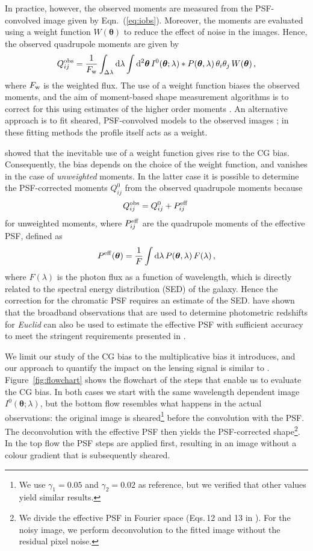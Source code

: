 \documentclass[useAMS,usenatbib]{mnras}
\renewcommand{\d}{\mathrm{d}}
\newcommand{\be}{\begin{equation}}
\newcommand{\ee}{\end{equation}}
\begin{document}
In practice, however, the observed moments are measured from the PSF-convolved image given by
Eqn.~(\ref{eq:iobs}). Moreover, the moments are evaluated using a weight function $W({\bm\theta})$  to reduce the effect of noise in the images. Hence, the observed quadrupole moments are given by
\be
Q^{\rm obs}_{ij} = {1 \over F_{\rm w}} \int_{\Delta\lambda} \d\lambda \int \d^2 {\bm\theta} \,
I^0({\bm\theta}; \lambda) *  P({\bm\theta},\lambda)\, \theta_i \theta_j \, W({\bm \theta})\,,
\ee
%
where $F_{\rm w}$ is the weighted flux. The use of a weight function biases the observed moments,
and the aim of moment-based shape measurement algorithms is to correct for this using estimates of the higher order moments \citep[e.g.][]{Kaiser1995,Melchior11}. An alternative approach is to fit sheared, PSF-convolved models to the observed images
\citep[e.g.][]{Bridle02,Miller13}; in these fitting methods the profile itself acts as a weight.

 showed that the inevitable use of a weight function gives rise to the CG bias.
Consequently, the bias depends on the choice of the weight function, and vanishes in the case of {\it unweighted} moments. In the latter case it is possible to determine the PSF-corrected moments $Q^0_{ij}$ from the observed quadrupole moments because
%
\be
Q^{\rm obs}_{ij}=Q^0_{ij}+P^{\rm eff}_{ij} \,\label{eq:unweighted}
\ee
%
for unweighted moments, where $P^{\rm eff}_{ij}$ are the quadrupole moments of the effective PSF,  defined as
\be
P^{\rm eff}({\bm \theta}) = \frac{1}{F} \int \d \lambda\, P({\bm \theta},\lambda)\, F(\lambda) \,,
\ee
%
where $F(\lambda)$ is the photon flux as a function of wavelength, which is directly related to the spectral energy distribution (SED) of the galaxy. Hence the correction for the chromatic PSF requires an estimate of the SED.  \cite{Eriksen17} have shown that the broadband observations that are used to determine photometric redshifts for {\it Euclid} can also be used to estimate the effective PSF with sufficient accuracy to meet the stringent requirements presented in \cite{Cropper13}.


We limit our study of the CG bias to the multiplicative bias it introduces, and our approach to quantify
the impact on the lensing signal is similar to . Figure~\ref{fig:flowchart} shows the flowchart of the steps that enable us to evaluate the CG bias.  In both cases we start with the same wavelength dependent image $I^0({\bm \theta};\lambda)$, but the bottom flow resembles what happens in the actual observations: the original image is sheared\footnote{We use
$\gamma_1=0.05$  and $\gamma_2=0.02$ as reference, but we verified that other values yield similar results.} before the convolution with the PSF. The deconvolution with the effective PSF then yields the PSF-corrected shape\footnote{We divide the effective PSF in Fourier space (Eqs.\,12 and 13 in ). For the noisy image, we perform deconvolution to the fitted image without the residual pixel noise.}. In the top flow the PSF steps are applied first, resulting in an image without a colour gradient that is subsequently sheared.
\end{document}
